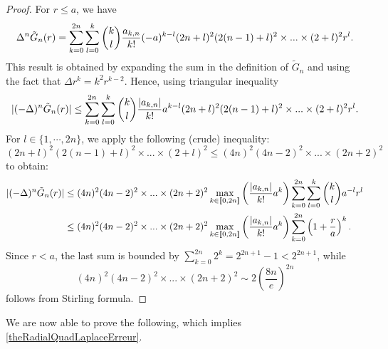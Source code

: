 \documentclass[11pt,a4paper]{article}
\begin{document}
\begin{proof} For $r \leq a$, we have
	\[\Delta^n \tilde{G}_n(r) = \sum_{k=0}^{2n}\sum_{l=0}^k \dbinom{k}{l}\dfrac{a_{k,n}}{k!}(-a)^{k-l}(2n+l)^2 (2(n-1)+l)^2\times ... \times (2+l)^2 r^{l}.\]
	This result is obtained by expanding the sum in the definition of $\tilde{G}_n$ and using the fact that $\Delta r^k = k^2r^{k-2}$. Hence, using triangular inequality
	\[|(-\Delta)^n \tilde{G}_n(r)| \leq \sum_{k=0}^{2n}\sum_{l=0}^k \dbinom{k}{l}\dfrac{|a_{k,n}|}{k!}a^{k-l}(2n+l)^2(2(n-1)+l)^2\times ... \times (2+l)^2r^{l}.\]	
	For $l\in \{1,\cdots,2n\}$, we apply the following (crude) inequality:
	\begin{equation}
		(2n+l)^2(2(n-1)+l)^2\times ... \times (2+l)^2 \leq (4n)^2(4n-2)^2 \times ... \times (2n+2)^2
		\label{estimationTresGrossiere}
	\end{equation}
	to obtain: 
	\begin{equation*}
		\begin{split}
			|(-\Delta)^n \tilde{G}_n(r)| &\leq (4n)^2(4n-2)^2 \times ... \times (2n+2)^2\max_{k\in\llbracket 0,2n\rrbracket}\left(\dfrac{|a_{k,n}|}{k!}a^k\right)\sum_{k=0}^{2n}\sum_{l=0}^k \dbinom{k}{l}a^{-l}r^l\\
			&\leq (4n)^2(4n-2)^2 \times ... \times (2n+2)^2\max_{k\in\llbracket 0,2n\rrbracket}\left(\dfrac{|a_{k,n}|}{k!}a^k\right)\sum_{k=0}^{2n}\left(1+\frac{r}{a}\right)^k.		
		\end{split}
	\end{equation*}
	Since $r<a$, the last sum is bounded by $\displaystyle\sum_{k=0}^{2n}2^k = 2^{2n+1}-1 < 2^{2n+1}$,
	while 
	\[(4n)^2(4n-2)^2\times...\times (2n+2)^2 \sim 2\left(\dfrac{8n}{e}\right)^{2n}\]
	follows from Stirling formula. \qedhere
\end{proof}
We are now able to prove the following, which implies \autoref{theRadialQuadLaplaceErreur}.
\end{document}
